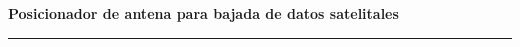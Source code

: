 \begin{titlepage}
{
\vspace{-5mm}
\begin{center}
 \LARGE \textbf{Posicionador de antena para bajada de datos satelitales}	
\end{center}
\vspace{-5mm}	
}
\rule{1\linewidth}{1mm} 
	

%
%
\end{titlepage}